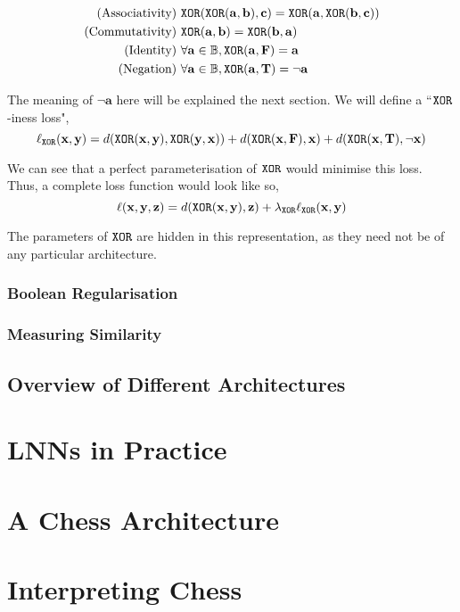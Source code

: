 \documentclass[conference]{report}
\begin{document}
$$
\begin{aligned}
\text{(Associativity)}&\ \texttt{XOR}(\texttt{XOR}(\mathbf{a, b}), \mathbf{c}) = \texttt{XOR}(\mathbf{a}, \texttt{XOR}(\mathbf{b, c})) \\
\text{(Commutativity)}&\ \texttt{XOR}(\mathbf{a, b}) = \texttt{XOR}(\mathbf{b, a}) \\
\text{(Identity)}&\ \forall \mathbf{a} \in \mathbb{B}, \texttt{XOR}(\mathbf{a}, \textbf{F}) = \mathbf{a} \\
\text{(Negation)}&\ \forall \mathbf{a} \in \mathbb{B}, \texttt{XOR}(\mathbf{a}, \textbf{T}) = \lnot \mathbf{a}
\end{aligned}
$$

The meaning of $\lnot\mathbf{a}$ here will be explained the next section. We will define a ``$\texttt{XOR}$-iness loss",
$$\ell_{\texttt{XOR}}(\mathbf{x,y}) = d(\texttt{XOR}(\mathbf{x, y}),\texttt{XOR}(\mathbf{y, x})) + d(\texttt{XOR}(\mathbf{x}, \textbf{F}), \mathbf{x}) + d(\texttt{XOR}(\mathbf{x}, \textbf{T}), \lnot \mathbf{x})$$

We can see that a perfect parameterisation of $\texttt{XOR}$ would minimise this loss. Thus, a complete loss function would look like so,
$$\ell(\mathbf{x,y,z}) = d(\texttt{XOR}(\mathbf{x,y}),\mathbf{z}) + \lambda_{\texttt{XOR}} \ell_{\texttt{XOR}}(\mathbf{x,y})$$

The parameters of $\texttt{XOR}$ are hidden in this representation, as they need not be of any particular architecture.

\subsection{Boolean Regularisation}

\subsection{Measuring Similarity}
 
\section{Overview of Different Architectures}
 
\chapter{LNNs in Practice} 

\chapter{A Chess Architecture}

\chapter{Interpreting Chess}
\end{document}
